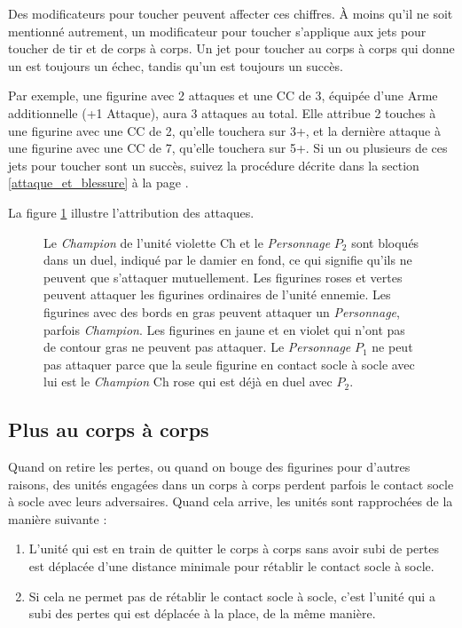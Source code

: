 Des modificateurs pour toucher peuvent affecter ces chiffres. À moins qu'il ne soit mentionné autrement, un modificateur pour toucher s'applique aux jets pour toucher de tir et de corps à corps. Un jet pour toucher au corps à corps qui donne un  est toujours un échec, tandis qu'un  est toujours un succès.

Par exemple, une figurine avec 2 attaques et une CC de 3, équipée d'une Arme additionnelle (+1 Attaque), aura 3 attaques au total. Elle attribue 2 touches à une figurine avec une CC de 2, qu'elle touchera sur 3+, et la dernière attaque à une figurine avec une CC de 7, qu'elle touchera sur 5+. Si un ou plusieurs de ces jets pour toucher sont un succès, suivez la procédure décrite dans la section \ref{attaque_et_blessure} à la page \pageref{attaque_et_blessure}.

La figure \ref{figure/attribution} illustre l'attribution des attaques.

\begin{figure}[!htbp]
\centering
\def\svgwidth{8cm}

\caption{Le \emph{Champion} de l'unité violette Ch et le \emph{Personnage} $ P_{2} $ sont bloqués dans un duel, indiqué par le damier en fond, ce qui signifie qu'ils ne peuvent que s'attaquer mutuellement. Les figurines roses et vertes peuvent attaquer les figurines ordinaires de l'unité ennemie. Les figurines avec des bords en gras peuvent attaquer un \emph{Personnage}, parfois \emph{Champion}. Les figurines en jaune et en violet qui n'ont pas de contour gras ne peuvent pas attaquer. Le \emph{Personnage} $ P_{1} $ ne peut pas attaquer parce que la seule figurine en contact socle à socle avec lui est le \emph{Champion} Ch rose qui est déjà en duel avec $ P_{2} $.}
\label{figure/attribution}
\end{figure}

\subsection{Plus au corps à corps}

Quand on retire les pertes, ou quand on bouge des figurines pour d'autres raisons, des unités engagées dans un corps à corps perdent parfois le contact socle à socle avec leurs adversaires. Quand cela arrive, les unités sont rapprochées de la manière suivante :
\begin{enumerate}
\item L'unité qui est en train de quitter le corps à corps sans avoir subi de pertes est déplacée d'une distance minimale pour rétablir le contact socle à socle.
\item Si cela ne permet pas de rétablir le contact socle à socle, c'est l'unité qui a subi des pertes qui est déplacée à la place, de la même manière.
\end{enumerate}

